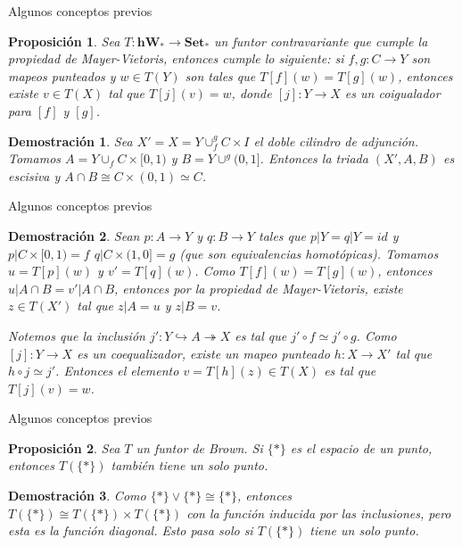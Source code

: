 \documentclass{beamer}
\newtheorem{pro}{Proposici\'on}
\newtheorem{dem}{Demostraci\'on}
\newcommand{\con}{\mathbf{Set}}
\newcommand{\W}{\mathbf{hW}}
\begin{document}
\begin{frame}{Algunos conceptos previos}
	\begin{pro}
		Sea $T\colon \W_\ast \to \con_\ast$ un funtor contravariante que cumple la propiedad de Mayer-Vietoris, entonces cumple lo siguiente: si $f,g\colon C \to Y$ son mapeos punteados y $w\in T(Y)$ son tales que $T[f](w)=T[g](w)$, entonces existe $v\in T(X)$ tal que $T[j](v)=w$, donde $[j]\colon Y\to X$ es un coigualador para $[f]$ y $[g]$.
	\end{pro}
	\begin{dem}
		Sea $X'=X=Y\cup_f ^g C\times I$ el doble cilindro de adjunción. Tomamos $A=Y\cup_f C\times [0,1)$ y $B=Y\cup^g(0,1]$. Entonces la triada $(X',A,B)$ es escisiva y $A\cap B\cong C\times(0,1)\simeq C$. 
	\end{dem}
\end{frame}

\begin{frame}{Algunos conceptos previos}
	\begin{dem}
		Sean $p\colon A\to Y$ y $q\colon B\to Y$ tales que $p|Y=q|Y=id$ y $p|C\times[0,1)=f$ $q|C\times(1,0]=g$ (que son equivalencias homotópicas). Tomamos $u=T[p](w)$ y $v'=T[q](w)$. Como $T[f](w)=T[g](w)$, entonces $u|A\cap B= v'|A\cap B$, entonces por la propiedad de Mayer-Vietoris, existe $z\in T(X')$ tal que $z|A=u$ y $z|B=v$.
		
		Notemos que la inclusión $j'\colon Y\hookrightarrow A \twoheadrightarrow X$ es tal que $j'\circ f\simeq j'\circ g$. Como $[j]\colon Y\to X$ es un coequalizador, existe un mapeo punteado $h\colon X\to X'$ tal que $h\circ j\simeq j'$. Entonces el elemento $v=T[h](z)\in T(X)$ es tal que $T[j](v)=w$.
	\end{dem}
\end{frame}

\begin{frame}{Algunos conceptos previos}
	\begin{pro}
		Sea $T$ un funtor de Brown. Si $\{\ast\}$ es el espacio de un punto, entonces $T(\{\ast\})$ también tiene un solo punto.
	\end{pro}
	
	\begin{dem}
		Como $\{\ast\}\vee\{\ast\}\cong \{\ast\}$, entonces $T(\{\ast\})\cong T(\{\ast\})\times T(\{\ast\})$ con la función inducida por las inclusiones, pero esta es la función diagonal. Esto pasa solo si $T(\{\ast\})$ tiene un solo punto.
	\end{dem}	
\end{frame}
\end{document}
